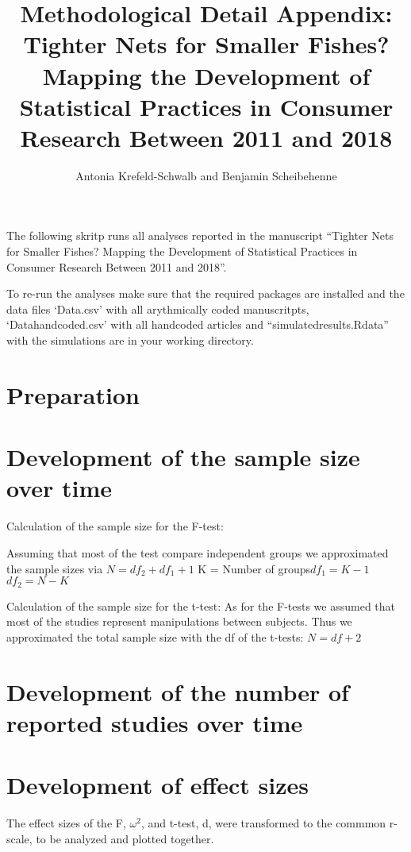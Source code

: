 \documentclass[
]{article}
\title{Methodological Detail Appendix: Tighter Nets for Smaller Fishes?
Mapping the Development of Statistical Practices in Consumer Research
Between 2011 and 2018}
\author{Antonia Krefeld-Schwalb and Benjamin Scheibehenne}
\date{}
\begin{document}
\maketitle

The following skritp runs all analyses reported in the manuscript
``Tighter Nets for Smaller Fishes? Mapping the Development of
Statistical Practices in Consumer Research Between 2011 and 2018''.

To re-run the analyses make sure that the required packages are
installed and the data files `Data.csv' with all arythmically coded
manuscritpts, `Datahandcoded.csv' with all handcoded articles and
``simulatedresults.Rdata'' with the simulations are in your working
directory.

\section{Preparation}

\section{Development of the sample size over time}

Calculation of the sample size for the F-test:

Assuming that most of the test compare independent groups we
approximated the sample sizes via \(N = df_2 + df_1 +1\) \newline K =
Number of groups\newline \(df_1 = K-1\) \newline \(df_2 = N-K\) \newline

Calculation of the sample size for the t-test: As for the F-tests we
assumed that most of the studies represent manipulations between
subjects. Thus we approximated the total sample size with the df of the
t-tests: \(N = df +2\)

\section{Development of the number of reported studies over time}

\section{Development of effect sizes}

The effect sizes of the F, \(\omega^2\), and t-test, d, were transformed
to the commmon r-scale, to be analyzed and plotted together.
\end{document}
